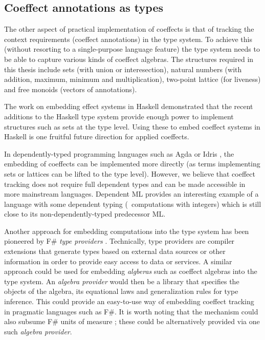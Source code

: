 
\subsection{Coeffect annotations as types}
\label{sec:unified-impl-types}

The other aspect of practical implementation of coeffects is that of tracking the context requirements
(coeffect annotations) in the type system. To achieve this (without resorting to a single-purpose
language feature) the type system needs to be able to capture various kinds of coeffect algebras. 
The structures required in this thesis include sets (with union or interesection), natural numbers (with 
addition, maximum, minimum and multiplication), two-point lattice (for liveness) and free monoids 
(vectors of annotations).

The work \cite{effects-embedding} on embedding effect systems in Haskell demonstrated that the
recent additions to the Haskell type system provide enough power to implement structures such
as sets at the type level. Using these to embed coeffect systems in Haskell is one fruitful 
future direction for applied coeffects.  

In dependently-typed programming languages such as Agda or Idris \cite{other-agda,other-idris},
the embedding of coeffects can be implemented more directly (as terms implementing sets or lattices
can be lifted to the type level). However, we believe that coeffect tracking does not require full 
dependent types and can be made accessible in more mainstream languages. Dependent ML 
\cite{types-dependent-ml} provides an interesting example of a language with some dependent typing 
(\eg~computations with integers) which is still close to its non-dependently-typed predecessor ML.

Another approach for embedding computations into the type system has been pioneered by F\#
\emph{type providers} \cite{app-inforich}. Technically, type providers are compiler extensions 
that generate types based on external data sources or other information in order to provide easy 
access to data or services. A similar approach could be used for embedding \emph{algberas} such
as coeffect algebras into the type system. An \emph{algebra provider} would then be a library that 
specifies the objects of the algebra, its equational laws and generalization rules for type inference.
This could provide an easy-to-use way of embedding coeffect tracking in pragmatic languages
such as F\#. It is worth noting that the mechanism could also subsume F\# units of measure
\cite{types-units-of-measure}; these could be alternatively provided via one such \emph{algebra
provider}.

